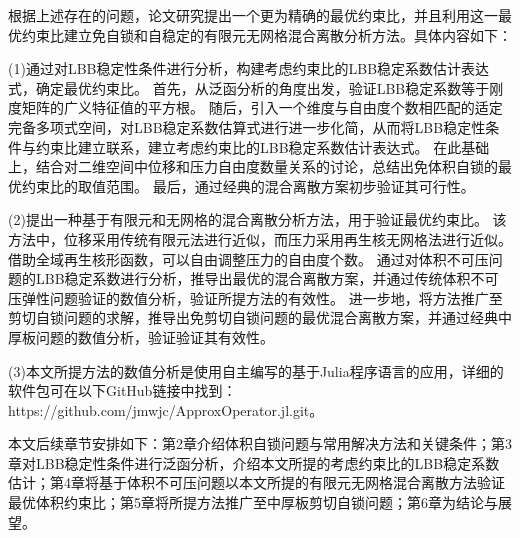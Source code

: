 根据上述存在的问题，论文研究提出一个更为精确的最优约束比，并且利用这一最优约束比建立免自锁和自稳定的有限元无网格混合离散分析方法。具体内容如下：

(1)通过对LBB稳定性条件进行分析，构建考虑约束比的LBB稳定系数估计表达式，确定最优约束比。
首先，从泛函分析的角度出发，验证LBB稳定系数等于刚度矩阵的广义特征值的平方根。
随后，引入一个维度与自由度个数相匹配的适定完备多项式空间，对LBB稳定系数估算式进行进一步化简，从而将LBB稳定性条件与约束比建立联系，建立考虑约束比的LBB稳定系数估计表达式。
在此基础上，结合对二维空间中位移和压力自由度数量关系的讨论，总结出免体积自锁的最优约束比的取值范围。
最后，通过经典的混合离散方案初步验证其可行性。

(2)提出一种基于有限元和无网格的混合离散分析方法，用于验证最优约束比。
该方法中，位移采用传统有限元法进行近似，而压力采用再生核无网格法进行近似。借助全域再生核形函数，可以自由调整压力的自由度个数。
通过对体积不可压问题的LBB稳定系数进行分析，推导出最优的混合离散方案，并通过传统体积不可压弹性问题验证的数值分析，验证所提方法的有效性。
进一步地，将方法推广至剪切自锁问题的求解，推导出免剪切自锁问题的最优混合离散方案，并通过经典中厚板问题的数值分析，验证验证其有效性。

(3)本文所提方法的数值分析是使用自主编写的基于Julia程序语言的应用，详细的软件包可在以下GitHub链接中找到：https://github.com/jmwjc/ApproxOperator.jl.git。

本文后续章节安排如下：第2章介绍体积自锁问题与常用解决方法和关键条件；第3章对LBB稳定性条件进行泛函分析，介绍本文所提的考虑约束比的LBB稳定系数估计；第4章将基于体积不可压问题以本文所提的有限元无网格混合离散方法验证最优体积约束比；第5章将所提方法推广至中厚板剪切自锁问题；第6章为结论与展望。